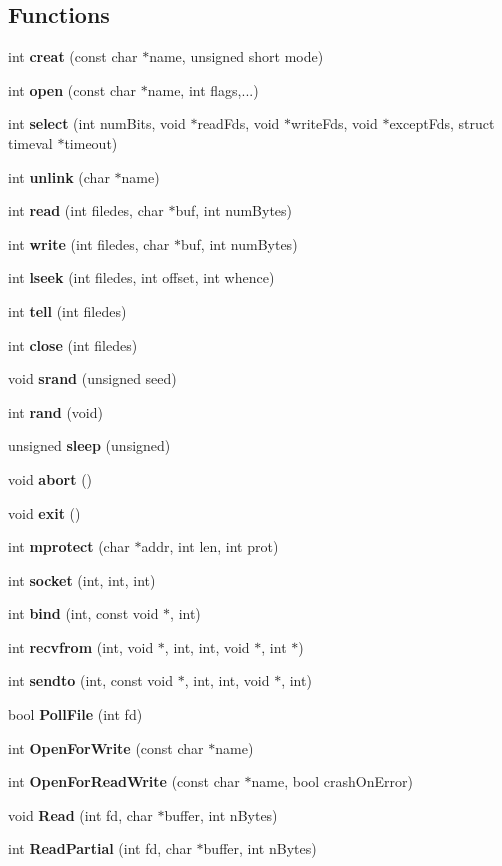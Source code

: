 \subsection*{Functions}
\begin{DoxyCompactItemize}
\item 
int {\bf creat} (const char $\ast$name, unsigned short mode)
\item 
int {\bf open} (const char $\ast$name, int flags,...)
\item 
int {\bf select} (int num\+Bits, void $\ast$read\+Fds, void $\ast$write\+Fds, void $\ast$except\+Fds, struct timeval $\ast$timeout)
\item 
int {\bf unlink} (char $\ast$name)
\item 
int {\bf read} (int filedes, char $\ast$buf, int num\+Bytes)
\item 
int {\bf write} (int filedes, char $\ast$buf, int num\+Bytes)
\item 
int {\bf lseek} (int filedes, int offset, int whence)
\item 
int {\bf tell} (int filedes)
\item 
int {\bf close} (int filedes)
\item 
void {\bf srand} (unsigned seed)
\item 
int {\bf rand} (void)
\item 
unsigned {\bf sleep} (unsigned)
\item 
void {\bf abort} ()
\item 
void {\bf exit} ()
\item 
int {\bf mprotect} (char $\ast$addr, int len, int prot)
\item 
int {\bf socket} (int, int, int)
\item 
int {\bf bind} (int, const void $\ast$, int)
\item 
int {\bf recvfrom} (int, void $\ast$, int, int, void $\ast$, int $\ast$)
\item 
int {\bf sendto} (int, const void $\ast$, int, int, void $\ast$, int)
\item 
bool {\bf Poll\+File} (int fd)
\item 
int {\bf Open\+For\+Write} (const char $\ast$name)
\item 
int {\bf Open\+For\+Read\+Write} (const char $\ast$name, bool crash\+On\+Error)
\item 
void {\bf Read} (int fd, char $\ast$buffer, int n\+Bytes)
\item 
int {\bf Read\+Partial} (int fd, char $\ast$buffer, int n\+Bytes)
\item 

\end{DoxyCompactItemize}

